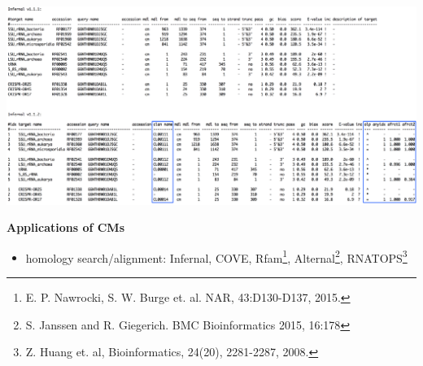 \documentclass[landscape]{slides}
\begin{document}
\begin{slide}
\begin{slide}
\begin{center}
\medskip
\medskip

\includegraphics[width=10in]{figs/overlap-examples}

\end{center}

\vfill
\end{slide}

\begin{slide}
\begin{center}
\textbf{Applications of CMs}
\end{center}

\small
\begin{itemize}
\item homology search/alignment: Infernal,
  COVE, Rfam\footnote{E. P. Nawrocki,
    S. W. Burge et. al.
    NAR, 43:D130-D137, 2015.}, 
    Alternal\footnote{S. Janssen and R. Giegerich. BMC Bioinformatics
      2015, 16:178}, RNATOPS\footnote{Z. Huang et. al, 
      Bioinformatics, 24(20), 2281-2287, 2008.}
    

\end{itemize}
\end{slide}
\end{slide}
\end{document}
